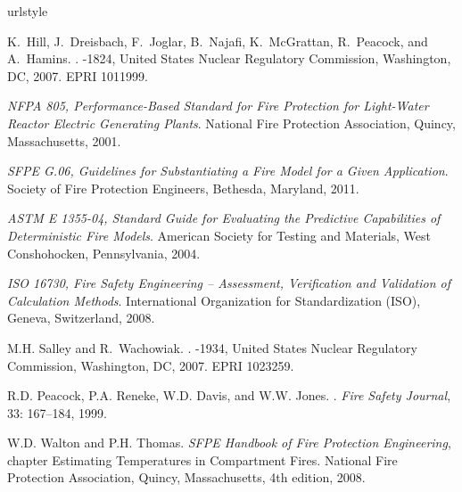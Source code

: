 \documentclass[fleqn,b5paper]{article}
\begin{document}
\begin{thebibliography}{12}
\providecommand{\natexlab}[1]{#1}
\providecommand{\url}[1]{\texttt{#1}}
\expandafter\ifx\csname urlstyle\endcsname\relax
  \providecommand{\doi}[1]{doi: #1}\else
  \providecommand{\doi}{doi: \begingroup \urlstyle{rm}\Url}\fi

K.~Hill, J.~Dreisbach, F.~Joglar, B.~Najafi, K.~McGrattan, R.~Peacock, and
  A.~Hamins.
.
-1824, United States Nuclear Regulatory Commission,
  Washington, DC, 2007.
\newblock EPRI 1011999.

\emph{NFPA 805, Performance-Based Standard for Fire Protection for Light-Water
  Reactor Electric Generating Plants}.
\newblock National Fire Protection Association, Quincy, Massachusetts, 2001.

\emph{{SFPE G.06, Guidelines for Substantiating a Fire Model for a Given
  Application}}.
\newblock Society of Fire Protection Engineers, Bethesda, Maryland, 2011.

\emph{{ASTM E 1355-04, Standard Guide for Evaluating the Predictive
  Capabilities of Deterministic Fire Models}}.
\newblock American Society for Testing and Materials, West Conshohocken,
  Pennsylvania, 2004.

\emph{{ISO 16730, Fire Safety Engineering -- Assessment, Verification and
  Validation of Calculation Methods}}.
\newblock International Organization for Standardization (ISO), Geneva,
  Switzerland, 2008.

M.H. Salley and R.~Wachowiak.
.
-1934, United States Nuclear Regulatory Commission,
  Washington, DC, 2007.
\newblock EPRI 1023259.

R.D. Peacock, P.A. Reneke, W.D. Davis, and W.W. Jones.
.
\newblock \emph{Fire Safety Journal}, 33: 167--184, 1999.

W.D. Walton and P.H. Thomas.
\newblock \emph{SFPE Handbook of Fire Protection Engineering}, chapter
  {Estimating Temperatures in Compartment Fires}.
\newblock National Fire Protection Association, Quincy, Massachusetts, 4th
  edition, 2008.


\end{thebibliography}
\end{document}
